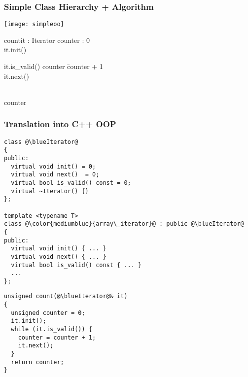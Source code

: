 \begin{frame}
  \frametitle{Simple Class Hierarchy + Algorithm}

\begin{multicols}{2}
%
  \begin{center}
    \texttt{[image: simpleoo]}
  \end{center}
%
\columnbreak
%
{\scriptsize
\begin{algorithm}{count}{it : Iterator}
  counter : \tunsigned \= 0 \\
  it.init() \\
  \begin{WHILE}{it.is\_valid()}
    \tab counter \= counter + 1 \\
    \tab it.next()
  \end{WHILE} \\
  \RETURN counter
\end{algorithm}
}
%
\end{multicols}

\end{frame}



\begin{frame}[fragile]
  \frametitle{Translation into C++ OOP}


\begin{multicols}{2}
%
\begin{lstlisting}[escapechar=@]
class @\blueIterator@
{
public:
  virtual void init() = 0;
  virtual void next()  = 0;
  virtual bool is_valid() const = 0;
  virtual ~Iterator() {}
};

template <typename T>
class @\color{mediumblue}{array\_iterator}@ : public @\blueIterator@
{
public:
  virtual void init() { ... }
  virtual void next() { ... }
  virtual bool is_valid() const { ... }
  ...
};
\end{lstlisting}
%
\columnbreak
%
\begin{lstlisting}[escapechar=@]
unsigned count(@\blueIterator@& it)
{
  unsigned counter = 0;
  it.init();
  while (it.is_valid()) {
    counter = counter + 1;
    it.next();
  }
  return counter;
}
\end{lstlisting}
%
\end{multicols}

\end{frame}



